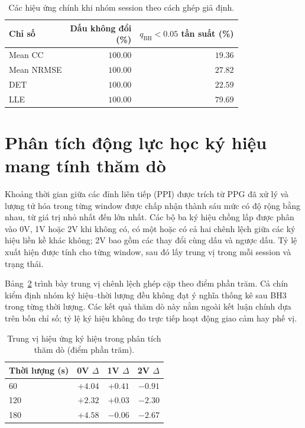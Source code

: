 \documentclass[conference,a4paper]{IEEEtran}
\begin{document}
\begin{table}[!t]
\centering
\caption{Các hiệu ứng chính khi nhóm session theo cách ghép giả định.}\label{tab:supp_dependence}
\footnotesize
\setlength{\tabcolsep}{3pt}
\renewcommand{\arraystretch}{1.05}
\begin{tabular}{@{}lrr@{}}
\toprule
Chỉ số & \makecell{Dấu không đổi\\(\%)} & \makecell{$q_{\mathrm{BH}}<0.05$\\tần suất (\%)}\\
\midrule
Mean CC & $100.00$ & $19.36$\\
Mean NRMSE & $100.00$ & $27.82$\\
DET & $100.00$ & $22.59$\\
LLE & $100.00$ & $79.69$\\
\bottomrule
\end{tabular}
\end{table}
\FloatBarrier
\section{Phân tích động lực học ký hiệu mang tính thăm dò}\label{sec:supp_8}
Khoảng thời gian giữa các đỉnh liên tiếp (PPI) được trích từ PPG đã xử lý và lượng tử hóa trong từng window được chấp nhận thành sáu mức có độ rộng bằng nhau, từ giá trị nhỏ nhất đến lớn nhất. Các bộ ba ký hiệu chồng lấp được phân vào 0V, 1V hoặc 2V khi không có, có một hoặc có cả hai chênh lệch giữa các ký hiệu liền kề khác không; 2V bao gồm các thay đổi cùng dấu và ngược dấu. Tỷ lệ xuất hiện được tính cho từng window, sau đó lấy trung vị trong mỗi session và trạng thái.

Bảng~\ref{tab:supp_symbolic} trình bày trung vị chênh lệch ghép cặp theo điểm phần trăm. Cả chín kiểm định nhóm ký hiệu--thời lượng đều không đạt ý nghĩa thống kê sau BH3 trong từng thời lượng. Các kết quả thăm dò này nằm ngoài kết luận chính dựa trên bốn chỉ số; tỷ lệ ký hiệu không đo trực tiếp hoạt động giao cảm hay phế vị.

\begin{table}[!t]
\centering
\caption{Trung vị hiệu ứng ký hiệu trong phân tích thăm dò (điểm phần trăm).}\label{tab:supp_symbolic}
\footnotesize
\setlength{\tabcolsep}{3pt}
\renewcommand{\arraystretch}{1.05}
\begin{tabular}{@{}lrrr@{}}
\toprule
Thời lượng (s) & 0V $\Delta$ & 1V $\Delta$ & 2V $\Delta$\\
\midrule
60 & $+4.04$ & $+0.41$ & $-0.91$\\
120 & $+2.32$ & $+0.03$ & $-2.30$\\
180 & $+4.58$ & $-0.06$ & $-2.67$\\
\bottomrule
\end{tabular}
\end{table}
\FloatBarrier
\end{document}
